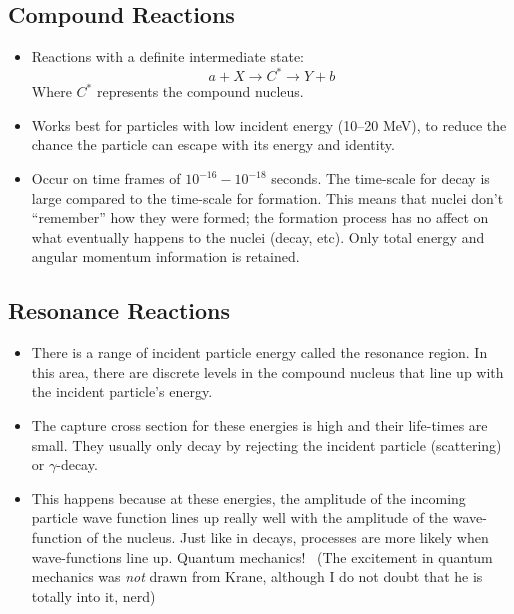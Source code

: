 \documentclass[letter]{article}
\begin{document}
\subsection{Compound Reactions}
\begin{itemize}
\item Reactions with a definite intermediate state:
  \begin{equation*}
    a + X \to C^* \to Y + b
  \end{equation*}
Where $C^*$ represents the compound nucleus.~\cite[pp. 416]{krane}
\item Works best for particles with low incident energy (10--20 MeV),
  to reduce the chance the particle can escape with its energy and
  identity.~\cite[pp. 416]{krane}
\item Occur on time frames of $10^{-16}-10^{-18}$ seconds. The
  time-scale for decay is large compared to the time-scale for
  formation. This means that nuclei don't ``remember'' how they were
  formed; the formation process has no affect on what eventually
  happens to the nuclei (decay, etc). Only total energy and angular
  momentum information is retained.~\cite[Lec 26]{lecture}
\end{itemize}

\subsection{Resonance Reactions}
\begin{itemize}
\item There is a range of incident particle energy called the
  resonance region. In this area, there are discrete levels in the
  compound nucleus that line up with the incident particle's
  energy.~\cite[pp. 424]{krane}
\item The capture cross section for these energies is high and their
  life-times are small. They usually only decay by rejecting the
  incident particle (scattering) or
  $\gamma$-decay.~\cite[pp. 424]{krane}
\item This happens because at these energies, the amplitude of the
  incoming particle wave function lines up really well with the
  amplitude of the wave-function of the
  nucleus. Just like in decays, processes are more likely when
  wave-functions line up. Quantum mechanics!~\cite[pp. 424]{krane}
  (The excitement in quantum mechanics was \textit{not} drawn from
  Krane, although I do not doubt that he is totally into it, nerd)
\end{itemize}
\end{document}
